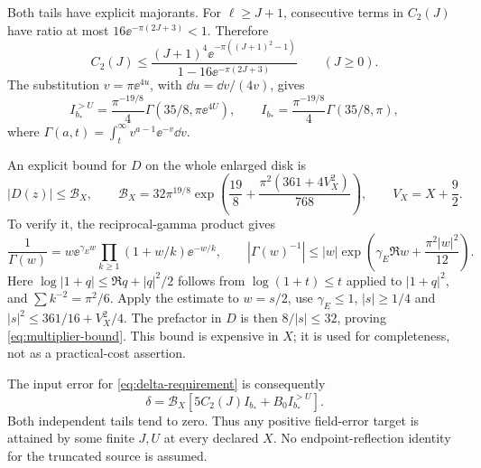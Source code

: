 Both tails have explicit majorants. For $\ell\ge J+1$, consecutive
terms in $C_2(J)$ have ratio at most
$16\ee^{-\pi(2J+3)}<1$. Therefore
\begin{equation}\label{eq:arithmetic-tail}
 C_2(J)\le
 \frac{(J+1)^4\ee^{-\pi((J+1)^2-1)}}
      {1-16\ee^{-\pi(2J+3)}}\qquad(J\ge0).
\end{equation}
The substitution $v=\pi\ee^{4u}$, with $\dd u=\dd v/(4v)$,
gives
\begin{equation}\label{eq:radial-tail}
 I_{b_*}^{>U}=\frac{\pi^{-19/8}}4
       \Gamma(35/8,\pi\ee^{4U}),\qquad
 I_{b_*}=\frac{\pi^{-19/8}}4\Gamma(35/8,\pi),
\end{equation}
where $\Gamma(a,t)=\int_t^\infty v^{a-1}\ee^{-v}\dd v$.

An explicit bound for $D$ on the whole enlarged disk is
\begin{equation}\label{eq:multiplier-bound}
 |D(z)|\le\mathcal B_X,\qquad
 \mathcal B_X=
 32\pi^{19/8}
 \exp\!\left(\frac{19}8+
       \frac{\pi^2(361+4V_X^2)}{768}\right),
 \qquad V_X=X+\frac92 .
\end{equation}
To verify it, the reciprocal-gamma product
\cite{DLMFReciprocalGammaOC} gives
\[
 \frac1{\Gamma(w)}
   =w\ee^{\gamma_{\!E}w}\prod_{k\ge1}(1+w/k)\ee^{-w/k},
 \qquad
 |\Gamma(w)^{-1}|
 \le |w|\exp\!\left(\gamma_{\!E}\Re w+
                      \frac{\pi^2|w|^2}{12}\right).
\]
Here $\log|1+q|\le\Re q+|q|^2/2$ follows from
$\log(1+t)\le t$ applied to $|1+q|^2$, and
$\sum k^{-2}=\pi^2/6$. Apply the estimate to $w=s/2$,
use $\gamma_{\!E}\le1$, $|s|\ge1/4$ and
$|s|^2\le361/16+V_X^2/4$. The prefactor in $D$ is then
$8/|s|\le32$, proving \eqref{eq:multiplier-bound}.
This bound is expensive in $X$; it is used for completeness, not
as a practical-cost assertion.

The input error for \eqref{eq:delta-requirement} is consequently
\begin{equation}\label{eq:complete-delta}
 \delta=\mathcal B_X
       \left[5C_2(J)I_{b_*}+B_0I_{b_*}^{>U}\right].
\end{equation}
Both independent tails tend to zero. Thus any positive field-error
target is attained by some finite $J,U$ at every declared $X$.
No endpoint-reflection identity for the truncated source is assumed.

